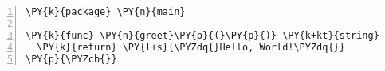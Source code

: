 \begin{Verbatim}[commandchars=\\\{\},numbers=left,firstnumber=1,stepnumber=1]
\PY{k}{package} \PY{n}{main}

\PY{k}{func} \PY{n}{greet}\PY{p}{(}\PY{p}{)} \PY{k+kt}{string} \PY{p}{\PYZob{}}
  \PY{k}{return} \PY{l+s}{\PYZdq{}Hello, World!\PYZdq{}}
\PY{p}{\PYZcb{}}
\end{Verbatim}
